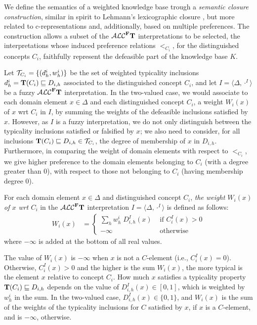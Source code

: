 \documentclass[runningheads]{llncs}
\newcommand{\tip}{{\bf T}}
\newcommand{\alcFt}{\mathcal{ALC}^{\Fe}\tip}
\newcommand {\Fe} {{\bf F}}
\begin{document}
We define the semantics of a weighted knowledge base trough a {\em semantic closure construction}, similar in spirit to Lehmann's lexicographic closure \cite{Lehmann95}, but more related to c-representations and, additionally, based on multiple preferences.
The construction allows a subset of the $\alcFt$ interpretations to be selected, 
the interpretations whose induced preference relations $<_{C_i}$, for the distinguished concepts $C_i$,  faithfully represent the defeasible part of the knowledge base $K$.

Let ${\cal T}_{C_i}=\{(d^i_h,w^i_h)\}$ be the set of weighted typicality inclusions $d^i_h= \tip(C_i) \sqsubseteq D_{i,h}$ associated to the distinguished concept $C_i$, and let $I=\langle \Delta, \cdot^I \rangle$ be a fuzzy $\alcFt$ interpretation.
In the two-valued case, we would associate to each domain element $x \in \Delta$ and each distinguished concept $C_i$, a weight $W_i(x)$ of $x$ wrt $C_i$ in $I$, by summing the weights of the defeasible inclusions satisfied by $x$.
However, as $I$ is a fuzzy interpretation, we do not only  distinguish between the typicality inclusions satisfied or  
falsified  by $x$;
 we also need to consider, for all inclusions $\tip(C_i) \sqsubseteq D_{i,h} \in {\cal T}_{C_i}$,  
the degree of membership of $x$ in $D_{i,h}$. 
Furthermore, in comparing the weight of domain elements with respect to $<_{C_i}$, we give higher preference to the domain elements belonging to $C_i$ (with a degree
greater than $0$), with respect to those 
not belonging to $C_i$ (having membership degree $0$). 

For each domain element $x \in \Delta$ and distinguished concept $C_i$, {\em the weight $W_i(x)$ of $x$ wrt $C_i$} in the $\alcFt$ interpretation $I=\langle \Delta, \cdot^I \rangle$ is defined as follows:
 \begin{align}\label{weight_fuzzy}
	W_i(x)  & = \left\{\begin{array}{ll}
						 \sum_{h} w_h^i  \; D_{i,h}^I(x) & \mbox{ \ \ \ \  if } C_i^I(x)>0 \\
						- \infty &  \mbox{ \ \ \ \  otherwise }  
					\end{array}\right.
\end{align} 
where $-\infty$ is added at the bottom of all real values.

The value of $W_i(x) $ is $- \infty $ when $x$ is not a $C$-element (i.e., $C_i^I(x)=0$). 
Otherwise, $C_i^I(x) >0$ and the higher is the sum $W_i(x) $, the more typical is the element $x$ relative to concept $C_i$.
How much $x$ satisfies a typicality property  $\tip(C_i) \sqsubseteq D_{i,h}$ depends on the value of $D_{i,h}^I(x) \in [0,1]$, which is weighted by $ w_h^i $ in the sum. 
In the two-valued case, $D_{i,h}^I(x) \in \{0,1\}$, and 
$W_i(x)$ is the sum of the weights of the typicality inclusions for $C$ satisfied by $x$, if $x$ is a $C$-element,  and is $-\infty $, otherwise.
\end{document}
